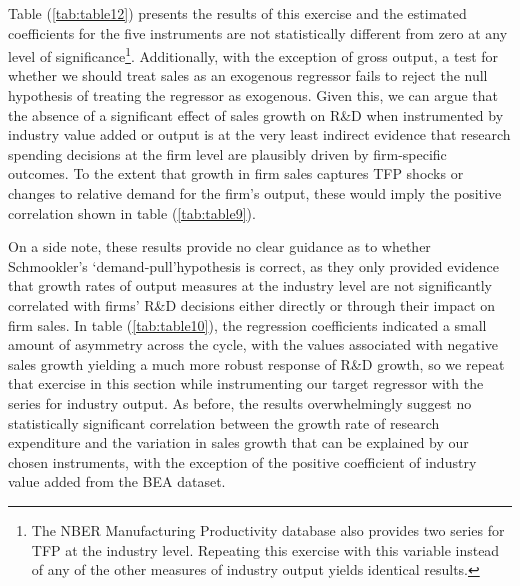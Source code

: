 \documentclass{_latex/house}
\begin{document}
Table (\ref{tab:table12}) presents the results of this exercise and the estimated coefficients for the five instruments are not statistically different from zero at any level of significance\footnote{The NBER Manufacturing Productivity database also provides two series for TFP at the industry level. Repeating this exercise with this variable instead of any of the other measures of industry output yields identical results.}. Additionally, with the exception of gross output, a test for whether we should treat sales as an exogenous regressor fails to reject the null hypothesis of treating the regressor as exogenous. Given this, we can argue that the absence of a significant effect of sales growth on R\&D when instrumented by industry value added or output is at the very least indirect evidence that research spending decisions at the firm level are plausibly driven by firm-specific outcomes. To the extent that growth in firm sales captures TFP shocks or changes to relative demand for the firm's output, these would imply the positive correlation shown in table (\ref{tab:table9}).

On a side note, these results provide no clear guidance as to whether Schmookler's \textquoteleft demand-pull\textquoteright\:hypothesis is correct, as they only provided evidence that growth rates of output measures at the industry level are not significantly correlated with firms' R\&D decisions either directly or through their impact on firm sales. In table (\ref{tab:table10}), the regression coefficients indicated a small amount of asymmetry across the cycle, with the values associated with negative sales growth yielding a much more robust response of R\&D growth, so we repeat that exercise in this section while instrumenting our target regressor with the series for industry output. As before, the results overwhelmingly suggest no statistically significant correlation between the growth rate of research expenditure and the variation in sales growth that can be explained by our chosen instruments, with the exception of the positive coefficient of industry value added from the BEA dataset.
\end{document}
